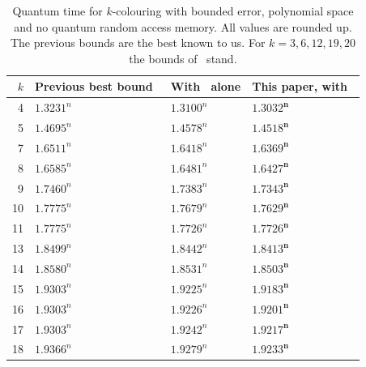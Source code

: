 \documentclass[11pt]{article}
\theoremstyle{remark}
\begin{document}
\begin{table}[h]
\centering
\small
\renewcommand{\arraystretch}{1.15}
\begin{tabular}{@{}rlll@{}}
\toprule
$k$ & Previous best bound~\cite{SM22} & With~\cite{WGJ24} alone & This paper, with~\cite{WGJ24,YS26}\\
\midrule
4 & $1.3231^n$ & $1.3100^n$ & $\mathbf{1.3032^n}$\\
5 & $1.4695^n$ & $1.4578^n$ & $\mathbf{1.4518^n}$\\
7 & $1.6511^n$ & $1.6418^n$ & $\mathbf{1.6369^n}$\\
8 & $1.6585^n$ & $1.6481^n$ & $\mathbf{1.6427^n}$\\
9 & $1.7460^n$ & $1.7383^n$ & $\mathbf{1.7343^n}$\\
10 & $1.7775^n$ & $1.7679^n$ & $\mathbf{1.7629^n}$\\
11 & $1.7775^n$ & $1.7726^n$ & $\mathbf{1.7726^n}$\\
13 & $1.8499^n$ & $1.8442^n$ & $\mathbf{1.8413^n}$\\
14 & $1.8580^n$ & $1.8531^n$ & $\mathbf{1.8503^n}$\\
15 & $1.9303^n$ & $1.9225^n$ & $\mathbf{1.9183^n}$\\
16 & $1.9303^n$ & $1.9226^n$ & $\mathbf{1.9201^n}$\\
17 & $1.9303^n$ & $1.9242^n$ & $\mathbf{1.9217^n}$\\
18 & $1.9366^n$ & $1.9279^n$ & $\mathbf{1.9233^n}$\\
\bottomrule
\end{tabular}
\caption{Quantum time for $k$-colouring with bounded error, polynomial space and no quantum random access memory. All values are rounded up. The previous bounds are the best known to us. For $k = 3, 6, 12, 19, 20$ the bounds of~\cite{SM22} stand.}
\label{tab:results}
\end{table}
\end{document}
